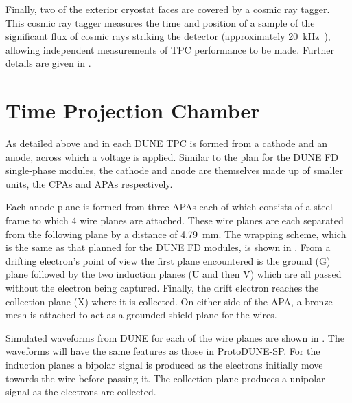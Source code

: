 Finally, two of the exterior cryostat faces are covered by a cosmic ray tagger.
This cosmic ray tagger measures the time and position of a sample of the significant flux of cosmic rays striking the detector (approximately \SI{20}{\kilo\hertz}~\cite{protodunePerformance}), allowing independent measurements of TPC performance to be made.
Further details are given in .

\section{Time Projection Chamber}
\label{sec:protodune:tpc}

As detailed above and in  each DUNE TPC is formed from a cathode and an anode, across which a voltage is applied.
Similar to the plan for the DUNE FD single-phase modules, the cathode and anode are themselves made up of smaller units, the CPAs and APAs respectively.

Each anode plane is formed from three APAs each of which consists of a steel frame to which 4 wire planes are attached.
These wire planes are each separated from the following plane by a distance of \SI{4.79}{\mm}.
The wrapping scheme, which is the same as that planned for the DUNE FD modules, is shown in .
From a drifting electron's point of view the first plane encountered is the ground (G) plane followed by the two induction planes (U and then V) which are all passed without the electron being captured.
Finally, the drift electron reaches the collection plane (X) where it is collected.
On either side of the APA, a bronze mesh is attached to act as a grounded shield plane for the wires.

Simulated waveforms from DUNE for each of the wire planes are shown in . 
The waveforms will have the same features as those in ProtoDUNE-SP.
For the induction planes a bipolar signal is produced as the electrons initially move towards the wire before passing it.
The collection plane produces a unipolar signal as the electrons are collected.

